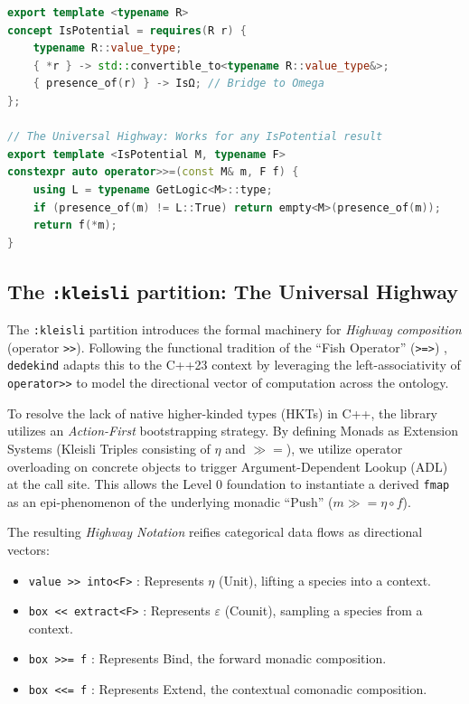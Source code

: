 \documentclass[11pt, a4paper]{report}
\begin{document}
\begin{lstlisting}[language=C++, caption={The $\Omega$-Monad: Structural Parity and the Universal Highway.}, label={lst:logic_monad}]
export template <typename R>
concept IsPotential = requires(R r) {
    typename R::value_type;
    { *r } -> std::convertible_to<typename R::value_type&>;
    { presence_of(r) } -> IsΩ; // Bridge to Omega
}; 

// The Universal Highway: Works for any IsPotential result
export template <IsPotential M, typename F>
constexpr auto operator>>=(const M& m, F f) {
    using L = typename GetLogic<M>::type;
    if (presence_of(m) != L::True) return empty<M>(presence_of(m));
    return f(*m);
}
\end{lstlisting}

\subsection{The \texttt{:kleisli} partition: The Universal Highway}
The \texttt{:kleisli} partition introduces the formal machinery for \textit{Highway composition} (operator \texttt{>>}).
Following the functional tradition of the ``Fish Operator'' (\texttt{>=>}) \cite{milewski2018category}, \texttt{dedekind} adapts this to the C++23 context by leveraging the left-associativity of \texttt{operator>>} to model the directional vector of computation across the ontology.

To resolve the lack of native higher-kinded types (HKTs) in C++, the library utilizes an \textit{Action-First} bootstrapping strategy. By defining Monads as Extension Systems (Kleisli Triples consisting of $\eta$ and $\gg=$), we utilize operator overloading on concrete objects to trigger Argument-Dependent Lookup (ADL) at the call site. This allows the Level 0 foundation to instantiate a derived \texttt{fmap} as an epi-phenomenon of the underlying monadic ``Push'' ($m \gg= \eta \circ f$).

The resulting \textit{Highway Notation} reifies categorical data flows as directional vectors:
\begin{itemize}
    \item \texttt{value >> into<F>} : Represents $\eta$ (Unit), lifting a species into a context.
    \item \texttt{box << extract<F>} : Represents $\varepsilon$ (Counit), sampling a species from a context.
    \item \texttt{box >>= f} : Represents Bind, the forward monadic composition.
    \item \texttt{box <<= f} : Represents Extend, the contextual comonadic composition.
\end{itemize}
\end{document}
